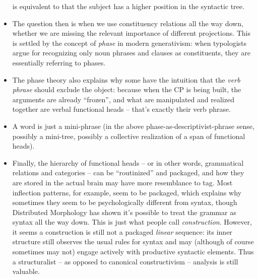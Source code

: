\documentclass[a4paper, oneside]{report}
\newcommand*{\term}[1]{\emph{#1}}
\begin{document}
\begin{itemize}
        is equivalent to that the subject has a higher position in the syntactic tree.
    \item The question then is when we use constituency relations all the way down, 
        whether we are missing the relevant importance of different projections. 
        This is settled by the concept of \emph{phase} in modern generativism:
        when typologists argue for recognizing only noun phrases and clauses as constituents, 
        they are essentially referring to phases. 
    \item The phase theory also explains why some have the intuition that 
        the \term{verb phrase} should exclude the object: 
        because when the CP is being built, 
        the arguments are already ``frozen'', 
        and what are manipulated and realized together 
        are verbal functional heads -- that's exactly their verb phrase. 
    \item A word is just a mini-phrase 
        (in the above phase-as-descriptivist-phrase sense, 
        possibly a mini-tree, possibly a collective realization of a span of functional heads).
    \item Finally, the hierarchy of functional heads -- or in other words, 
        grammatical relations and categories -- 
        can be ``routinized'' and packaged,
        and how they are stored in the actual brain 
        may have more resemblance to \ac{tag}. 
        Most inflection patterns, for example, 
        seem to be packaged, 
        which explains why sometimes they seem to be psychologically different from syntax, 
        though Distributed Morphology has shown it's possible to treat the grammar 
        as syntax all the way down. 
        This is just what people call \term{construction}.
        However, it seems a construction is still not a packaged \emph{linear} sequence: 
        its inner structure still observes the usual rules for syntax 
        and may (although of course sometimes may not) engage 
        actively with productive syntactic elements. 
        Thus a structuralist -- as opposed to canonical constructivism -- 
        analysis is still valuable.
\end{itemize}
\end{document}
